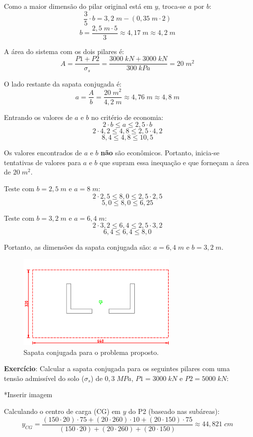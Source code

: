 Como a maior dimensão do pilar original está em $y$, troca-se $a$ por $b$:
$$\frac{3}{5}\cdot b=3,2\;m-(0,35\;m\cdot2)$$
$$b=\frac{2,5\;m\cdot5}{3}\approx4,17\;m\approx4,2\;m$$

A área do sistema com os dois pilares é:
$$A=\frac{P1+P2}{\sigma_s}=\frac{3000\;kN+3000\;kN}{300\;kPa}=20\;m^2$$

O lado restante da sapata conjugada é:
$$a=\frac{A}{b}=\frac{20\;m^2}{4,2\;m}\approx4,76\;m\approx4,8\;m$$

Entrando os valores de $a$ e $b$ no critério de economia:
$$2\cdot b\leqslant a\leqslant2,5\cdot b$$
$$2\cdot4,2\leqslant4,8\leqslant2,5\cdot4,2$$
$$8,4\leqslant4,8\leqslant10,5$$

Os valores encontrados de $a$ e $b$ \textbf{não} são econômicos. Portanto, inicia-se tentativas de valores para $a$ e $b$ que supram essa inequação e que forneçam a área de $20\;m^2$.

Teste com $b=2,5\;m$ e $a=8\;m$:
$$2\cdot2,5\leqslant8,0\leqslant2,5\cdot2,5$$
$$5,0\leqslant8,0\leqslant6,25$$

Teste com $b=3,2\;m$ e $a=6,4\;m$:
$$2\cdot3,2\leqslant6,4\leqslant2,5\cdot3,2$$
$$6,4\leqslant6,4\leqslant8,0$$

Portanto, as dimensões da sapata conjugada são: $a=6,4\;m$ e $b=3,2\;m$.
\begin{figure}[H]
	\begin{center}
	\caption{Sapata conjugada para o problema proposto.}
    	\includegraphics[width=0.7\textwidth]{Fundacoes-rasas-ou-diretas/Imagens/Exercicio-1-Sapata-conjugada-parte6.png}
	\end{center}
\end{figure}

\textbf{Exercício}: Calcular a sapata conjugada para os seguintes pilares com uma tensão admissível do solo ($\sigma_s$) de $0,3\;MPa$, $P1=3000\;kN$ e $P2=5000\;kN$:

*Inserir imagem

Calculando o centro de carga (CG) em $y$ do P2 (baseado nas subáreas):
$$y_{CG}=\frac{(150\cdot20)\cdot75+(20\cdot260)\cdot10+(20\cdot150)\cdot75}{(150\cdot20)+(20\cdot260)+(20\cdot150)}\approx44,821\;cm$$

